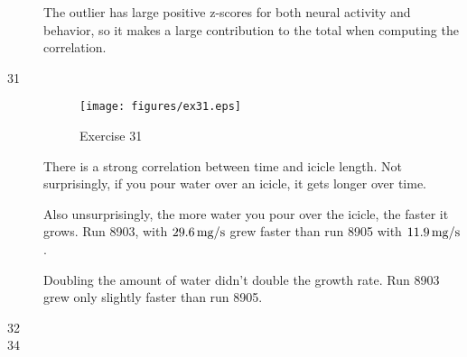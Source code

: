 \documentclass[letterpaper, landscape]{exam}
\begin{document}
\begin{description}
\begin{parts}
            The outlier has large positive z-scores for both neural activity and
            behavior, so it makes a large contribution to the total when computing
            the correlation.

        \end{parts}

      \item[31]
        \begin{figure}[H]
          \centering
          \texttt{[image: figures/ex31.eps]}
          \caption{Exercise 31}
        \end{figure}

        There is a strong correlation between time and icicle length.  Not surprisingly,
        if you pour water over an icicle, it gets longer over time.

        Also unsurprisingly, the more water you pour over the icicle, the faster it grows.
        Run 8903, with $\unit[29.6]{mg/s}$ grew faster than run 8905 with
        $\unit[11.9]{mg/s}$.

        Doubling the amount of water didn't double the growth rate.  Run 8903 grew only
        slightly faster than run 8905.

      \item[32]

      \item[34]
        \begin{parts}

\end{parts}
\end{description}
\end{document}
